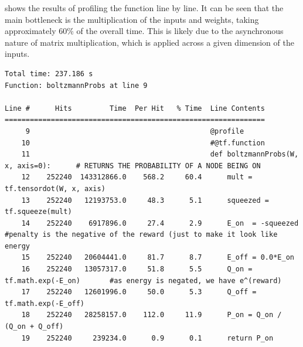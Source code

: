  shows the results of profiling the  function line by line. 
It can be seen that the main bottleneck is the multiplication of the inputs and weights, taking approximately 60\% of the overall time.
This is likely due to the asynchronous nature of matrix multiplication, which is applied across a given dimension of the inputs. 


\begin{minipage}{\linewidth}
\begin{lstlisting}[caption=Line by line profiling of the rbm\#boltzmannProbs function in eager execution mode, label=profiling:line_boltzmann]
Total time: 237.186 s
Function: boltzmannProbs at line 9

Line #      Hits         Time  Per Hit   % Time  Line Contents
==============================================================
     9                                           @profile
    10                                           #@tf.function
    11                                           def boltzmannProbs(W, x, axis=0):      # RETURNS THE PROBABILITY OF A NODE BEING ON
    12    252240  143312866.0    568.2     60.4      mult = tf.tensordot(W, x, axis)
    13    252240   12193753.0     48.3      5.1      squeezed = tf.squeeze(mult)
    14    252240    6917896.0     27.4      2.9      E_on  = -squeezed       #penalty is the negative of the reward (just to make it look like energy
    15    252240   20604441.0     81.7      8.7      E_off = 0.0*E_on
    16    252240   13057317.0     51.8      5.5      Q_on = tf.math.exp(-E_on)       #as energy is negated, we have e^(reward)
    17    252240   12601996.0     50.0      5.3      Q_off = tf.math.exp(-E_off)
    18    252240   28258157.0    112.0     11.9      P_on = Q_on / (Q_on + Q_off)
    19    252240     239234.0      0.9      0.1      return P_on
\end{lstlisting}
\end{minipage}



